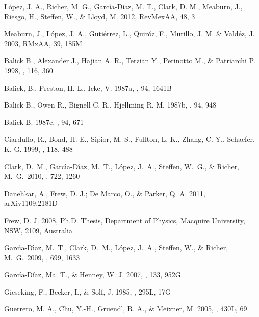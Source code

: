 \documentclass{aa}
\begin{document}
%
\begin{thebibliography}{}


 L\'opez, J. A., Richer, M. G.,
  Garc\'ia-D\'iaz, M. T., Clark, D. M., Meaburn, J., Riesgo, H., Steffen,
  W., \& Lloyd, M. 2012, RevMexAA, 48, 3

 Meaburn, J., L\'opez,
J. A., Guti\'errez, L., Quir\'oz, F., Murillo, J. M. \& Vald\'ez, J.
2003, RMxAA, 39, 185M








 Balick B., Alexander J.,
  Hajian A. R., Terzian Y., Perinotto M., \& Patriarchi P. 1998,
  \apj, 116, 360

 Balick, B., Preston, H. L.,
  Icke, V. 1987a, \aj, 94, 1641B

 Balick B., Owen R., Bignell
  C. R., Hjellming R. M. 1987b, \aj, 94, 948

 Balick B. 1987c, \aj, 94, 671

 Ciardullo, R., Bond,
  H. E., Sipior, M. S., Fullton, L. K., Zhang, C.-Y., Schaefer,
  K. G. 1999, \aj, 118, 488
  
  Clark, D.~M., 
Garc{\'{\i}}a-D{\'{\i}}az, M.~T., L{\'o}pez, J.~A., Steffen, W.~G., 
\& Richer, M.~G.\ 2010, \apj, 722, 1260 

 Danehkar, A., Frew, D. J.;
  De Marco, O., \& Parker, Q. A. 2011, arXiv1109.2181D
  
 Frew, D. J. 2008, Ph.D. Thesis, Department of Physics,
  Macquire University, NSW, 2109, Australia
  
Garc{\'{\i}}a-D{\'{\i}}az, M.~T., Clark, D.~M., L{\'o}pez, J.~A., Steffen, 
W., \& Richer, M.~G.\ 2009, \apj, 699, 1633 

 Garc\'ia-D\'iaz,
  Ma. T., \& Henney, W. J. 2007, \aj, 133, 952G

 Gieseking, F., Becker,
  I., \& Solf, J. 1985, \apj, 295L, 17G

 Guerrero, M. A., Chu,
  Y.-H., Gruendl, R. A., \& Meixner, M. 2005, \aap, 430L, 69


\end{thebibliography}
\end{document}
